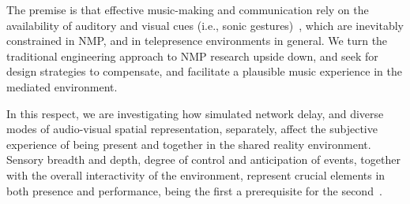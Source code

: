 The premise is that effective music-making and communication rely on the availability of auditory and visual cues (i.e., sonic gestures)~\cite{godoy2010musical}, which are inevitably constrained in NMP, and in telepresence environments in general. 
We turn the traditional engineering approach to NMP research upside down, and seek for design strategies to compensate, and facilitate a plausible music experience in the mediated environment. 

In this respect, we are investigating how simulated network delay, and diverse modes of audio-visual spatial representation, separately, affect the subjective experience of being present and together in the shared reality environment. 
Sensory breadth and depth, degree of control and anticipation of events, together with the overall interactivity of the environment, represent crucial elements in both presence and performance, being the first a prerequisite for the second~\cite{nash2000review}.

